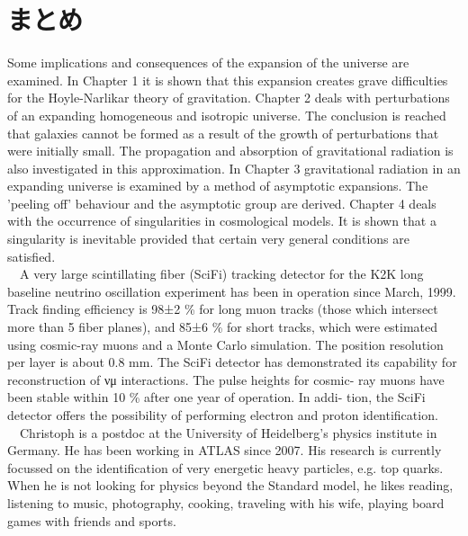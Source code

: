 \documentclass[12pt]{jsarticle}
\begin{document}
\section{まとめ}
Some implications and consequences of the expansion of the universe are examined. In Chapter 1 it is shown that this expansion creates grave difficulties for the Hoyle-Narlikar theory of gravitation. Chapter 2 deals with perturbations of an expanding homogeneous and isotropic universe. The conclusion is reached that galaxies cannot be formed as a result of the growth of perturbations that were initially small. The propagation and absorption of gravitational radiation is also investigated in this approximation. In Chapter 3 gravitational radiation in an expanding universe is examined by a method of asymptotic expansions. The 'peeling off' behaviour and the asymptotic group are derived. Chapter 4 deals with the occurrence of singularities in cosmological models. It is shown that a singularity is inevitable provided that certain very general conditions are satisfied.\\
　A very large scintillating fiber (SciFi) tracking detector for the K2K long baseline neutrino oscillation experiment has been in operation since March, 1999. Track finding efficiency is 98±2 \% for long muon tracks (those which intersect more than 5 fiber planes), and 85±6 \% for short tracks, which were estimated using cosmic-ray muons and a Monte Carlo simulation. The position resolution per layer is about 0.8 mm. The SciFi detector has demonstrated its capability for reconstruction of νμ interactions. The pulse heights for cosmic- ray muons have been stable within 10 \% after one year of operation. In addi- tion, the SciFi detector offers the possibility of performing electron and proton identification.\\
　Christoph is a postdoc at the University of Heidelberg’s physics institute in Germany. He has been working in ATLAS since 2007. His research is currently focussed on the identification of very energetic heavy particles, e.g. top quarks. When he is not looking for physics beyond the Standard model, he likes reading, listening to music, photography, cooking, traveling with his wife, playing board games with friends and sports.
\end{document}
